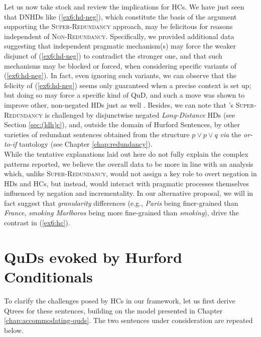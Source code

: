 Let us now take stock and review the implications for HCs. We have just seen that DNHDs like (\ref{ex6:hd-neg}), which constitute the basis of the argument supporting the \textsc{Super-Redundancy} approach, may be felicitous for reasons independent of \textsc{Non-Redundancy}. Specifically, we provided additional data suggesting that independent pragmatic mechanism(s) may force the weaker disjunct of (\ref{ex6:hd-neg}) to contradict the stronger one, and that such mechanisms may be blocked or forced, when considering specific variants of (\ref{ex6:hd-neg}). In fact, even ignoring such variants, we can observe that the felicity of (\ref{ex6:hd-neg}) seems only guaranteed when a precise context is set up; but doing so may force a specific kind of QuD, and such a move was shown to improve other, non-negated HDs just as well \citep{Haslinger2023}. Besides, we can note that \cite{Kalomoiros2024}'s \textsc{Super-Redundancy} is challenged by disjunctwise negated \textit{Long-Distance} HDs (see Section \ref{sec:(ldh)c}), and, outside the domain of Hurford Sentences, by other varieties of redundant sentences obtained from the structure $p\vee p \vee q$ \textit{via} the \textit{or-to-if} tautology (see Chapter \ref{chap:redundancy}).\\

While the tentative explanations laid out here do not fully explain the complex patterns reported, we believe the overall data to be more in line with an analysis which, unlike \textsc{Super-Redundancy}, would not assign a key role to overt negation in HDs and HCs, but instead, would interact with pragmatic processes themselves influenced by negation and incrementality. In our alternative proposal, we will in fact suggest that \textit{granularity} differences (e.g., \textit{Paris} being finer-grained than \textit{France}, \textit{smoking Marlboros} being more fine-grained than \textit{smoking}), drive the contrast in (\ref{ex6:hc}).



\section{QuDs evoked by Hurford Conditionals}\label{sec6:machinery}


To clarify the challenges posed by HCs in our framework, let us first derive Qtrees for these sentences, building on the model presented in Chapter \ref{chap:accommodating-quds}. The two sentences under consideration are repeated below. 

\begin{exe}
	\begin{xlist}
	\end{xlist}
\end{exe}

